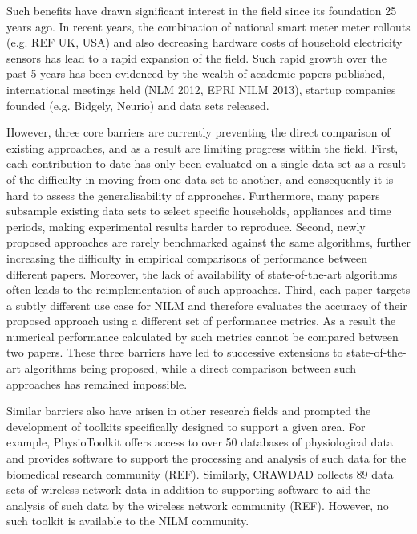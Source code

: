 \documentclass{sig-alternate}
\begin{document}
Such benefits have drawn significant interest in the field since its foundation 25 years ago. In recent years, the combination of national smart meter meter rollouts (e.g. REF UK, USA) and also decreasing hardware costs of household electricity sensors has lead to a rapid expansion of the field. Such rapid growth over the past 5 years has been evidenced by the wealth of academic papers published, international meetings held (NLM 2012, EPRI NILM 2013), startup companies founded (e.g. Bidgely, Neurio) and data sets released.

However, three core barriers are currently preventing the direct comparison of existing approaches, and as a result are limiting progress within the field. First, each contribution to date has only been evaluated on a single data set as a result of the difficulty in moving from one data set to another, and consequently it is hard to assess the generalisability of approaches. Furthermore, many papers subsample existing data sets to select specific households, appliances and time periods, making experimental results harder to reproduce. Second, newly proposed approaches are rarely benchmarked against the same algorithms, further increasing the difficulty in empirical comparisons of performance between different papers. Moreover, the lack of availability of state-of-the-art algorithms often leads to the reimplementation of such approaches. Third, each paper targets a subtly different use case for NILM and therefore evaluates the accuracy of their proposed approach using a different set of performance metrics. As a result the numerical performance calculated by such metrics cannot be compared between two papers. These three barriers have led to successive extensions to state-of-the-art algorithms being proposed, while a direct comparison between such approaches has remained impossible.

Similar barriers also have arisen in other research fields and prompted the development of toolkits specifically designed to support a given area. For example, PhysioToolkit offers access to over 50 databases of physiological data and provides software to support the processing and analysis of such data for the biomedical research community (REF). Similarly, CRAWDAD collects 89 data sets of wireless network data in addition to supporting software to aid the analysis of such data by the wireless network community (REF). However, no such toolkit is available to the NILM community.
\end{document}
